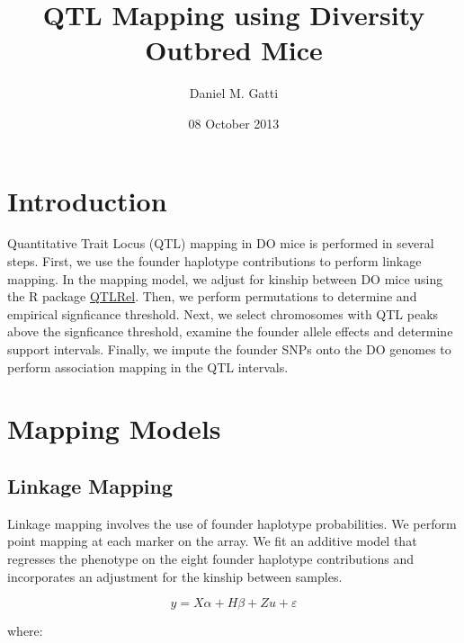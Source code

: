 \documentclass{article}
\begin{document}


\title{QTL Mapping using Diversity Outbred Mice}
\author{Daniel M. Gatti}
\date{08 October 2013}
\maketitle

\section{Introduction}

Quantitative Trait Locus (QTL) mapping in DO mice is performed in several steps. First, we use the founder haplotype contributions to perform linkage mapping. In the mapping model, we adjust for kinship between DO mice using the R package \href{http://cran.r-project.org/web/packages/QTLRel/}{QTLRel}. Then, we perform permutations to determine and empirical signficance threshold. Next, we select chromosomes with QTL peaks above the signficance threshold, examine the founder allele effects and determine support intervals. Finally, we impute the founder SNPs onto the DO genomes to perform association mapping in the QTL intervals.
  
\section{Mapping Models}

\subsection{Linkage Mapping}
  
Linkage mapping involves the use of founder haplotype probabilities. We perform point mapping at each marker on the array. We fit an additive model that regresses the phenotype on the eight founder haplotype contributions and incorporates an adjustment for the kinship between samples. 
  
\begin{equation}
y = X\alpha + H\beta + Zu + \varepsilon
\end{equation}

where:
\end{document}
